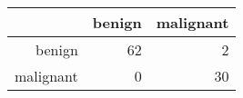 \begin{tabular}{rrr}
  \hline
 & benign & malignant \\ 
  \hline
benign &  62 &   2 \\ 
  malignant &   0 &  30 \\ 
   \hline
\end{tabular}
